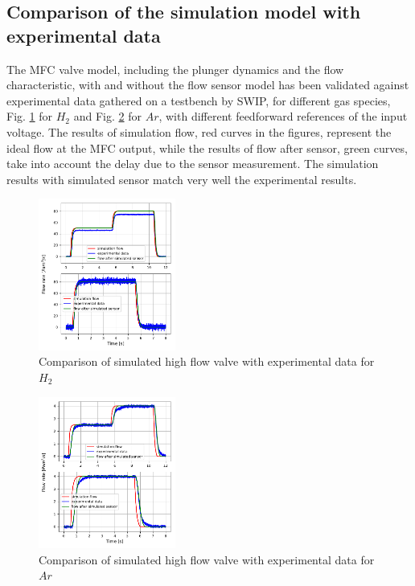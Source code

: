 \documentclass[letterpaper, 10pt, conference]{ieeeconf}
\begin{document}
\subsection{Comparison of the simulation model with experimental data}
The MFC valve model, including the plunger dynamics and the flow characteristic, with and without the flow sensor model has been validated against experimental data gathered on a testbench by SWIP, for different gas species, Fig. \ref{fig:mdl_H2} for $H_2$ and Fig. \ref{fig:mdl_Ar} for $Ar$, with different feedforward references of the input voltage. The results of simulation flow, red curves in the figures, represent the ideal flow at the MFC output, while the results of flow after sensor, green curves, take into account the delay due to the sensor measurement. The simulation results with simulated sensor match very well the experimental results. 

\begin{figure}[!ht]
    \centering
    \includegraphics[width=0.4\textwidth]{H2_model.pdf}
    \caption{Comparison of simulated high flow valve with experimental data for $H_2$ }
    \label{fig:mdl_H2}
\end{figure}

\begin{figure}[!ht]
    \centering
    \includegraphics[width=0.4\textwidth]{Ar_model.pdf}
    \caption{Comparison of simulated high flow valve with experimental data for $Ar$}
    \label{fig:mdl_Ar}
\end{figure}
\end{document}
